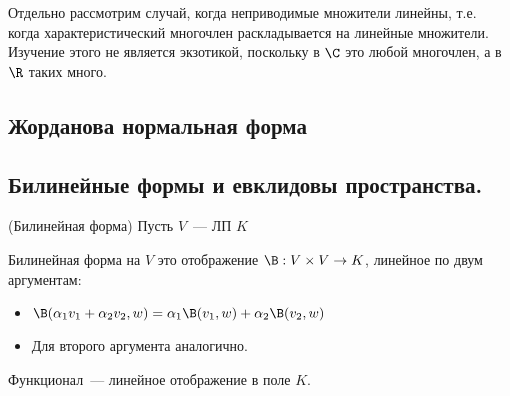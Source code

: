 \vspace*{5mm}

Отдельно рассмотрим случай, когда неприводимые множители линейны, т.е. когда характеристический многочлен раскладывается на линейные множители.
Изучение этого не является экзотикой, поскольку в $\C$ это любой многочлен, а в $\R$ таких много.

\subsection{Жорданова нормальная форма}

\subsection{Билинейные формы и евклидовы пространства.}

\begin{conj}(Билинейная форма)
Пусть $V$~--- ЛП $K$

Билинейная форма на $V$ это отображение $\B: V \times V \to K$, линейное по двум аргументам:
\begin{itemize}
    \item $\B(\alpha_1 v_1 + \alpha_2 v_2, w) = \alpha_1 \B(v_1, w) + \alpha_2\B(v_2, w)$
    \item Для второго аргумента аналогично.
\end{itemize}
\end{conj}

\notice Функционал~--- линейное отображение в поле $K$.


